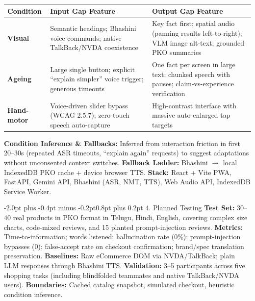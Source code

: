 \documentclass[10pt,a4paper]{article}
\makeatletter
\renewcommand{\section}{\@startsection{section}{1}{\z@}%
  {-2.0pt plus -0.4pt minus -0.2pt}{0.8pt plus 0.2pt}%
  {\normalfont\footnotesize\bfseries\scshape}}
\makeatother
\begin{document}
\vspace{-2pt}
\begin{center}
\scriptsize
\begin{tabular}{|l|p{5.8cm}|p{8.8cm}|}
\hline
\textbf{Condition} & \textbf{Input Gap Feature} & \textbf{Output Gap Feature} \\
\hline
\textbf{Visual} & Semantic headings; Bhashini voice commands; native TalkBack/NVDA coexistence & Key fact first; spatial audio (panning results left-to-right); VLM image alt-text; grounded PKO summaries \\
\textbf{Ageing} & Large single button; explicit ``explain simpler'' voice trigger; generous timeouts & One fact per screen in large text; chunked speech with pauses; claim-vs-experience verification \\
\textbf{Hand-motor} & Voice-driven slider bypass (WCAG 2.5.7); zero-touch speech auto-capture & High-contrast interface with massive auto-enlarged tap targets \\
\hline
\end{tabular}
\end{center}
\vspace{-3pt}

\textbf{Condition Inference \& Fallbacks:} Inferred from interaction friction in first 20--30s (repeated ASR timeouts, ``explain again'' requests) to suggest adaptations without unconsented context switches. \textbf{Fallback Ladder:} Bhashini $\rightarrow$ local IndexedDB PKO cache + device browser TTS. \textbf{Stack:} React + Vite PWA, FastAPI, Gemini API, Bhashini (ASR, NMT, TTS), Web Audio API, IndexedDB Service Worker.

\vspace{-2pt}
\section{4. Planned Testing}
\textbf{Test Set:} 30--40 real products in PKO format in Telugu, Hindi, English, covering complex size charts, code-mixed reviews, and 15 planted prompt-injection reviews. \quad
\textbf{Metrics:} Time-to-information; words listened; hallucination rate (0\%); prompt-injection bypasses (0); false-accept rate on checkout confirmation; brand/spec translation preservation. \quad
\textbf{Baselines:} Raw eCommerce DOM via NVDA/TalkBack; plain LLM responses through Bhashini TTS. \quad
\textbf{Validation:} 3--5 participants across five shopping tasks (including blindfolded teammates and native TalkBack/NVDA users). \quad
\textbf{Boundaries:} Cached catalog snapshot, simulated checkout, heuristic condition inference.
\end{document}
